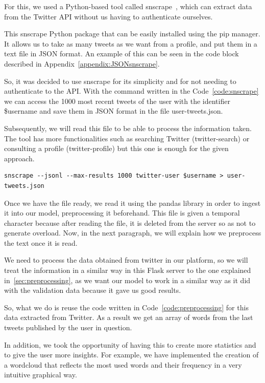 For this, we used a Python-based tool called snscrape~\cite{JustAnot83:online}, which can extract data from the Twitter API without us having to authenticate ourselves. 

This snscrape Python package that can be easily installed using the pip manager. It allows us to take as many tweets as we want from a profile, and put them in a text file in JSON format. An example of this can be seen in the code block described in Appendix~\ref{appendix:JSONsnscrape}.

So, it was decided to use snscrape for its simplicity and for not needing to authenticate to the API. With the command written in the Code~\ref{code:snscrape} we can access the 1000 most recent tweets of the user with the identifier \$username and save them in JSON format in the file user-tweets.json.

Subsequently, we will read this file to be able to process the information taken. The tool has more functionalities such as searching Twitter (twitter-search) or consulting a profile (twitter-profile) but this one is enough for the given approach.

\begin{lstlisting}[caption={Command executed for obtaining tweets}, label={code:snscrape}]
snscrape --jsonl --max-results 1000 twitter-user $username > user-tweets.json
\end{lstlisting}

Once we have the file ready, we read it using the pandas library in order to ingest it into our model, preprocessing it beforehand. This file is given a temporal character because after reading the file, it is deleted from the server so as not to generate overload. Now, in the next paragraph, we will explain how we preprocess the text once it is read.

We need to process the data obtained from twitter in our platform, so we will treat the information in a similar way in this Flask server to the one explained in~\ref{sec:preprocessing}, as we want our model to work in a similar way as it did with the validation data because it gave us good results. 


So, what we do is reuse the code written in Code~\ref{code:preprocessing} for this data extracted from Twitter. As a result we get an array of words from the last tweets published by the user in question.

In addition, we took the opportunity of having this to create more statistics and to give the user more insights. For example, we have implemented the creation of a wordcloud that reflects the most used words and their frequency in a very intuitive graphical way.

